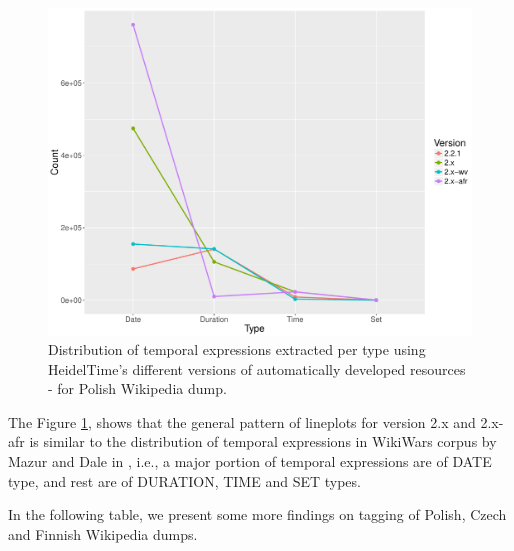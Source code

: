 \begin{figure}[H] 
	\centering
	\includegraphics[width=14cm]{Plots/polish-tempex-type-landscape}
	\caption{Distribution of temporal expressions extracted per type using HeidelTime's different versions of automatically developed resources - for Polish Wikipedia dump.}
	\label{figure:5a}
\end{figure}

The Figure \ref{figure:5a}, shows that the general pattern of lineplots for version 2.x and 2.x-afr is similar to the distribution of temporal expressions in WikiWars corpus by Mazur and Dale in \cite{mazur2010wikiwars}, i.e., a major portion of temporal expressions are of DATE type, and rest are of DURATION, TIME and SET types.

In the following table, we present some more findings on tagging of Polish, Czech and Finnish Wikipedia dumps.

